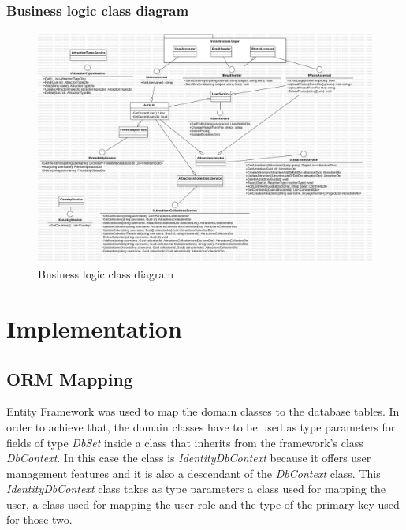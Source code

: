\subsubsection{Business logic class diagram}

\begin{figure}[!ht]
    \centering
    \includegraphics[width=1\linewidth]{business-class-diagram.png}
    \caption{Business logic class diagram}
    \label{fig:enter-label}
\end{figure}

\section{Implementation}

\subsection{ORM Mapping}

\par Entity Framework was used to map the domain classes to the database tables. In order to achieve that, the domain classes have to be used as type parameters for fields of type \textit{DbSet} inside a class that inherits from the framework's class \textit{DbContext}. In this case the class is \textit{IdentityDbContext} because it offers user management features and it is also a descendant of the \textit{DbContext} class. This \textit{IdentityDbContext} class takes as type parameters a class used for mapping the user, a class used for mapping the user role and the type of the primary key used for those two.

